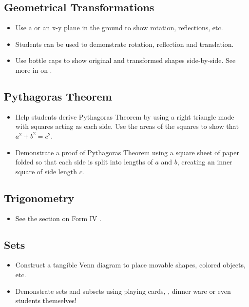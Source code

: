 	\subsection{Geometrical Transformations}
	\begin{itemize}
	\item Use a  or an x-y plane in the ground to show rotation, reflections, etc.
	\item Students can be used to demonstrate rotation, reflection and translation.
	\item Use bottle caps to show original and transformed shapes side-by-side. See more in  on .
	\end{itemize}
	
	\subsection{Pythagoras Theorem}
	\begin{itemize}
	\item Help students derive Pythagoras Theorem by using a right triangle made with squares acting as each side. Use the areas of the squares to show that $a^2 + b^2 = c^2$.
	\item Demonstrate a proof of Pythagoras Theorem using a  square sheet of paper folded so that each side is split into lengths of $a$ and $b$, creating an inner square of side length $c$.
	\end{itemize}
	
	\subsection{Trigonometry}
	\begin{itemize}
	\item See the section on Form IV .
	\end{itemize}
	
	\subsection{Sets}
	\begin{itemize}
	\item Construct a tangible Venn diagram to place movable shapes, colored objects, etc.
	\item Demonstrate sets and subsets using playing cards, , dinner ware or even students themselves!
	\end{itemize}
	
